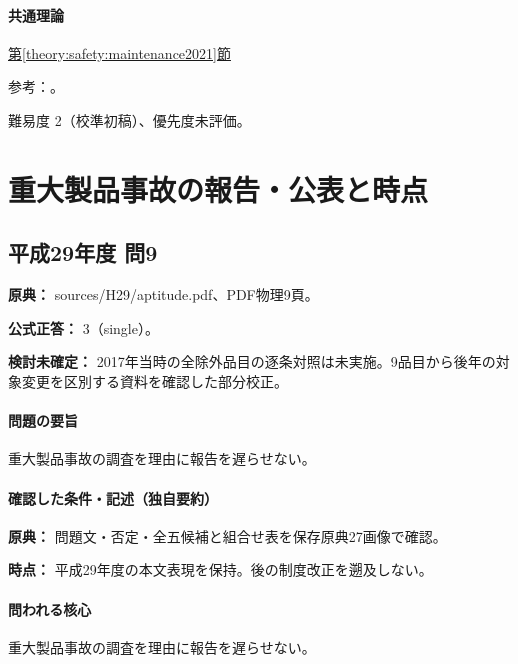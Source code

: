 \paragraph{共通理論} \hyperref[theory:safety:maintenance2021]{第\ref*{theory:safety:maintenance2021}節}

\par 参考：\cite{saf53_infra2021}。

\par 難易度 2（校準初稿）、優先度未評価。

\section{重大製品事故の報告・公表と時点}

\subsection{平成29年度 問9}
\label{q:h29-reg-apt-09}

\noindent\textbf{原典：} sources/H29/aptitude.pdf、PDF物理9頁。

\textbf{公式正答：} 3（single）。

\par\textbf{検討未確定：} 2017年当時の全除外品目の逐条対照は未実施。9品目から後年の対象変更を区別する資料を確認した部分校正。

\paragraph{問題の要旨} 重大製品事故の調査を理由に報告を遅らせない。

\paragraph{確認した条件・記述（独自要約）}\mbox{}\par

\noindent\textbf{原典：} 問題文・否定・全五候補と組合せ表を保存原典27画像で確認。\par

\noindent\textbf{時点：} 平成29年度の本文表現を保持。後の制度改正を遡及しない。\par

\paragraph{問われる核心} 重大製品事故の調査を理由に報告を遅らせない。

